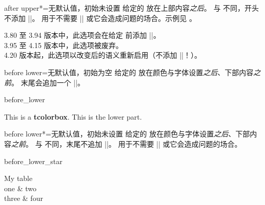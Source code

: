 \begin{docTcbKey}[][doc new and updated={2016-10-21}{2019-02-28}]{after upper*}{=}{无默认值，初始未设置}
  给定的  放在上部内容\emph{之后}。
  与  不同，开头不添加 |\unskip|。
  用于不需要 |\unskip| 或它会造成问题的场合。示例见 。
  \begin{marker}
  3.80 至 3.94 版本中，此选项会在给定  前添加 |\unskip|。\\
  3.95 至 4.15 版本中，此选项被废弃。\\
  4.20 版本起，此选项以改变后的语义重新启用（不添加 |\unskip|！）。
  \end{marker}
\end{docTcbKey}


\clearpage
\begin{docTcbKey}{before lower}{=}{无默认值，初始为空}
  给定的  放在颜色与字体设置\emph{之后}、下部内容\emph{之前}。
   末尾会追加一个 |\ignorespaces|。
\begin{exdispExample}{before_lower}

\begin{tcolorbox}
This is a \textbf{tcolorbox}.
\tcblower
This is the lower part.
\end{tcolorbox}
\end{exdispExample}
\end{docTcbKey}


\begin{docTcbKey}[][doc new=2019-02-26]{before lower*}{=}{无默认值，初始未设置}
  给定的  放在颜色与字体设置\emph{之后}、下部内容\emph{之前}。
  与  不同，末尾不追加 |\ignorespaces|。
  用于不需要 |\ignorespaces| 或它会造成问题的场合。
\begin{exdispExample}{before_lower_star}
\begin{tcolorbox}[size=small,bicolor,sidebyside,center lower,
  colback=yellow!30,colbacklower=yellow!20,colframe=yellow!80!black,
  before lower*=\begin{tabular}{cc},
  after lower*=\end{tabular},
]
My table
\tcblower
  \\
  one & two \\
  three & four\\
\end{tcolorbox}
\end{exdispExample}
\end{docTcbKey}


